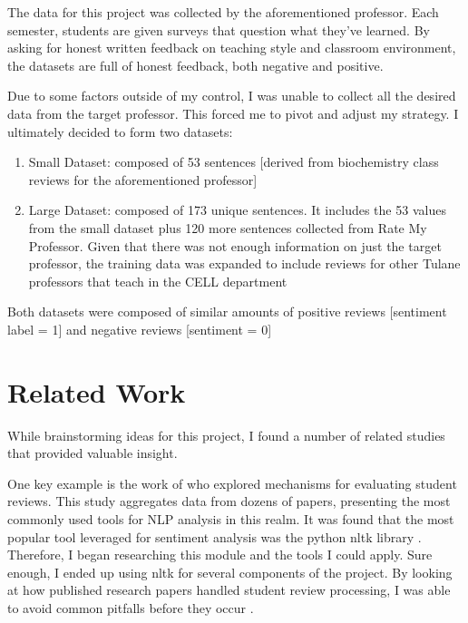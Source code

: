 \documentclass[11pt,a4paper]{article}
\begin{document}
The data for this project was collected by the aforementioned professor. Each semester, students are given surveys that question what they’ve learned. By asking for honest written feedback on teaching style and classroom environment, the datasets are full of honest feedback, both negative and positive. 

Due to some factors outside of my control, I was unable to collect all the desired data from the target professor. This forced me to pivot and adjust my strategy. I ultimately decided to form two datasets:
\begin{enumerate}
    \item Small Dataset: composed of 53 sentences [derived from biochemistry class reviews for the aforementioned professor]
    \item Large Dataset: composed of 173 unique sentences. It includes the 53 values from the small dataset plus 120 more sentences collected from Rate My Professor. Given that there was not enough information on just the target professor, the training data was expanded to include reviews for other Tulane professors that teach in the CELL department
\end{enumerate}
Both datasets were composed of similar amounts of positive reviews [sentiment label = 1] and negative reviews [sentiment = 0]


\section{Related Work}

While brainstorming ideas for this project, I found a number of related studies that provided valuable insight.

One key example is the work of \citet{Kastrati_studentfeedback} who explored mechanisms for evaluating student reviews. This study aggregates data from dozens of papers, presenting the most commonly used tools for NLP analysis in this realm. It was found that the most popular tool leveraged for sentiment analysis was the python nltk library \citep{Kastrati_studentfeedback}. Therefore, I began researching this module and the tools I could apply. Sure enough, I ended up using nltk for several components of the project. By looking at how published research papers handled student review processing, I was able to avoid common pitfalls before they occur .
\end{document}
